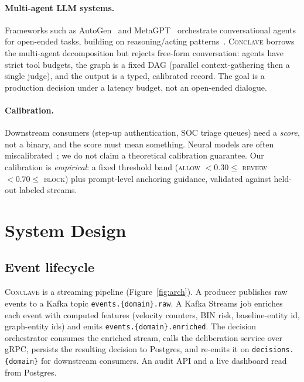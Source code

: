 \documentclass[sigconf,nonacm,screen]{acmart}
\newcommand{\dt}{.\allowbreak}    %
\begin{document}
\paragraph{Multi-agent LLM systems.}
Frameworks such as AutoGen~\cite{wu2024autogen} and MetaGPT~\cite{hong2024metagpt}
orchestrate conversational agents for open-ended tasks, building on
reasoning/acting patterns~\cite{yao2023react,wei2022chain}. \textsc{Conclave}
borrows the multi-agent decomposition but rejects free-form conversation: agents
have strict tool budgets, the graph is a fixed DAG (parallel context-gathering
then a single judge), and the output is a typed, calibrated record. The goal is a
production decision under a latency budget, not an open-ended dialogue.

\paragraph{Calibration.}
Downstream consumers (step-up authentication, SOC triage queues) need a
\emph{score}, not a binary, and the score must mean something. Neural models are
often miscalibrated~\cite{guo2017calibration}; we do not claim a theoretical
calibration guarantee. Our calibration is \emph{empirical}: a fixed threshold
band (\textsc{allow} $<0.30 \le$ \textsc{review} $<0.70 \le$ \textsc{block}) plus
prompt-level anchoring guidance, validated against held-out labeled streams.

\section{System Design}
\label{sec:design}

\subsection{Event lifecycle}

\textsc{Conclave} is a streaming pipeline (Figure~\ref{fig:arch}). A producer
publishes raw events to a Kafka topic \texttt{events\dt\{domain\}\dt raw}. A Kafka
Streams job enriches each event with computed features (velocity counters, BIN
risk, baseline-entity id, graph-entity ids) and emits
\texttt{events\dt\{domain\}\dt enriched}. The decision orchestrator consumes the
enriched stream, calls the deliberation service over gRPC, persists the resulting
decision to Postgres, and re-emits it on \texttt{decisions\dt\{domain\}} for
downstream consumers. An audit API and a live dashboard read from Postgres.
\end{document}

